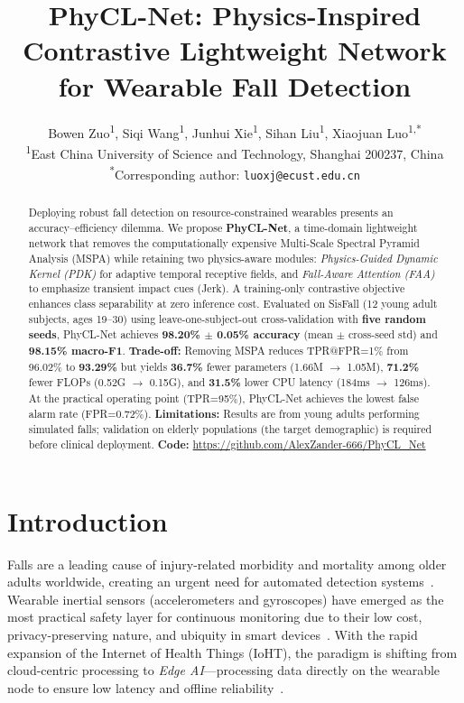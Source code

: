 \documentclass{article}
\title{PhyCL-Net: Physics-Inspired Contrastive Lightweight Network for Wearable Fall Detection}
\author{
	Bowen Zuo\textsuperscript{1}, Siqi Wang\textsuperscript{1}, Junhui Xie\textsuperscript{1}, Sihan Liu\textsuperscript{1}, Xiaojuan Luo\textsuperscript{1,*}\\
	\textsuperscript{1}East China University of Science and Technology, Shanghai 200237, China\\
	\textsuperscript{*}Corresponding author: \texttt{luoxj@ecust.edu.cn}
}
\begin{document}
\maketitle

\begin{abstract}
Deploying robust fall detection on resource-constrained wearables presents an accuracy--efficiency dilemma. We propose \textbf{PhyCL-Net}, a time-domain lightweight network that removes the computationally expensive Multi-Scale Spectral Pyramid Analysis (MSPA) while retaining two physics-aware modules: \textit{Physics-Guided Dynamic Kernel (PDK)} for adaptive temporal receptive fields, and \textit{Fall-Aware Attention (FAA)} to emphasize transient impact cues (Jerk). A training-only contrastive objective enhances class separability at zero inference cost. Evaluated on SisFall (12 young adult subjects, ages 19--30) using leave-one-subject-out cross-validation with \textbf{five random seeds}, PhyCL-Net achieves \textbf{98.20\% $\pm$ 0.05\% accuracy} (mean $\pm$ cross-seed std) and \textbf{98.15\% macro-F1}. \textbf{Trade-off:} Removing MSPA reduces TPR@FPR=1\% from 96.02\% to \textbf{93.29\%} but yields \textbf{36.7\%} fewer parameters (1.66M $\to$ 1.05M), \textbf{71.2\%} fewer FLOPs (0.52G $\to$ 0.15G), and \textbf{31.5\%} lower CPU latency (184ms $\to$ 126ms). At the practical operating point (TPR=95\%), PhyCL-Net achieves the lowest false alarm rate (FPR=0.72\%). \textbf{Limitations:} Results are from young adults performing simulated falls; validation on elderly populations (the target demographic) is required before clinical deployment. \textbf{Code:} \url{https://github.com/AlexZander-666/PhyCL_Net}
\end{abstract}


\section{Introduction}

Falls are a leading cause of injury-related morbidity and mortality among older adults worldwide, creating an urgent need for automated detection systems~\cite{Bergen2016Falls,Newaz2023Methods}. Wearable inertial sensors (accelerometers and gyroscopes) have emerged as the most practical safety layer for continuous monitoring due to their low cost, privacy-preserving nature, and ubiquity in smart devices~\cite{Igual2013Challenges,Chaccour2017Sensors,Casilari2015Wearable}. With the rapid expansion of the Internet of Health Things (IoHT), the paradigm is shifting from cloud-centric processing to \textit{Edge AI}—processing data directly on the wearable node to ensure low latency and offline reliability~\cite{Ramachandran2020Survey,Guo2016Practical}.
\end{document}
